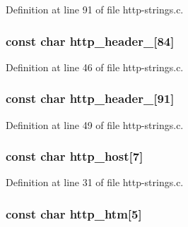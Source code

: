 Definition at line 91 of file http-\/strings.c.

\hypertarget{http-strings_8h_af0c31564afc8cb5ffe3006045593564a}{
\subsubsection[{http\_\-header\_\-200}]{\setlength{\rightskip}{0pt plus 5cm}const char {\bf http\_\-header\_}\mbox{[}84\mbox{]}}}
\label{http-strings_8h_af0c31564afc8cb5ffe3006045593564a}


Definition at line 46 of file http-\/strings.c.

\hypertarget{http-strings_8h_ae076ba5c11f61efb98c599b3252ea8e7}{
\subsubsection[{http\_\-header\_\-404}]{\setlength{\rightskip}{0pt plus 5cm}const char {\bf http\_\-header\_}\mbox{[}91\mbox{]}}}
\label{http-strings_8h_ae076ba5c11f61efb98c599b3252ea8e7}


Definition at line 49 of file http-\/strings.c.

\hypertarget{http-strings_8h_a61e4dca10281be3a140757f3d8fbf019}{
\subsubsection[{http\_\-host}]{\setlength{\rightskip}{0pt plus 5cm}const char {\bf http\_\-host}\mbox{[}7\mbox{]}}}
\label{http-strings_8h_a61e4dca10281be3a140757f3d8fbf019}


Definition at line 31 of file http-\/strings.c.

\hypertarget{http-strings_8h_a26642210d36f0e7f65fb3a98402e8f88}{
\subsubsection[{http\_\-htm}]{\setlength{\rightskip}{0pt plus 5cm}const char {\bf http\_\-htm}\mbox{[}5\mbox{]}}}
\label{http-strings_8h_a26642210d36f0e7f65fb3a98402e8f88}


